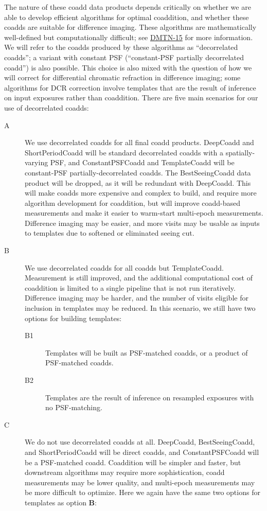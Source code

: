 The nature of these coadd data products depends critically on whether we are able to develop efficient algorithms for optimal coaddition, and whether these coadds are suitable for difference imaging.  These algorithms are mathematically well-defined but computationally difficult; see \href{http://dmtn-015.lsst.io/en/latest/}{DMTN-15} for more information.  We will refer to the coadds produced by these algorithms as ``decorrelated coadds''; a variant with constant PSF (``constant-PSF partially decorrelated coadd'') is also possible.  This choice is also mixed with the question of how we will correct for differential chromatic refraction in difference imaging; some algorithms for DCR correction involve templates that are the result of inference on input exposures rather than coaddition.  There are five main scenarios for our use of decorrelated coadds:
\begin{description}
  \item[A] We use decorrelated coadds for all final coadd products.  DeepCoadd and ShortPeriodCoadd will be standard decorrelated coadds with a spatially-varying PSF, and ConstantPSFCoadd and TemplateCoadd will be constant-PSF partially-decorrelated coadds.  The BestSeeingCoadd data product will be dropped, as it will be redundant with DeepCoadd.  This will make coadds more expensive and complex to build, and require more algorithm development for coaddition, but will improve coadd-based measurements and make it easier to warm-start multi-epoch measurements.  Difference imaging may be easier, and more visits may be usable as inputs to templates due to softened or eliminated seeing cut.
  \item[B] We use decorrelated coadds for all coadds but TemplateCoadd.  Measurement is still improved, and the additional computational cost of coaddition is limited to a single pipeline that is not run iteratively.  Difference imaging may be harder, and the number of visits eligible for inclusion in templates may be reduced.  In this scenario, we still have two options for building templates:
  \begin{description}
    \item[B1] Templates will be built as PSF-matched coadds, or a product of PSF-matched coadds.
    \item[B2] Templates are the result of inference on resampled exposures with no PSF-matching.
  \end{description}
  \item[C] We do not use decorrelated coadds at all.  DeepCoadd, BestSeeingCoadd, and ShortPeriodCoadd will be direct coadds, and ConstantPSFCoadd will be a PSF-matched coadd.  Coaddition will be simpler and faster, but downstream algorithms may require more sophistication, coadd measurements may be lower quality, and multi-epoch measurements may be more difficult to optimize.  Here we again have the same two options for templates as option \textbf{B}:

\end{description}
